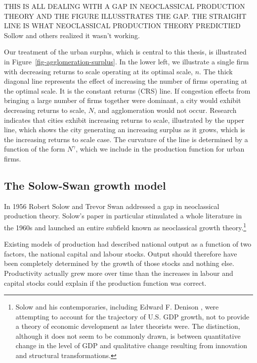 {THIS IS ALL DEALING WITH A GAP IN NEOCLASSICAL PRODUCTION THEORY AND THE FIGURE ILLUSSTRATES THE GAP. THE STRAIGHT LINE IS WHAT NEOCLASSICAL PRODUCTION THEORY PREDICTIED Sollow and others realized it  wasn't working. 

Our treatment of the urban surplus, which is central to this thesis, is illustrated in Figure~\ref{fig-agglomeration-surplus}. 
In the lower left, we illustrate a single firm with decreasing returns to scale operating at its optimal scale, $n$. The thick diagonal line represents the effect of increasing the number of firms operating at the optimal scale. It is the constant returns (CRS) line. If congestion effects from bringing a large number of firms together were dominant, a city would exhibit decreasing returns to  scale,  $N$, and agglomeration would not occur. Research indicates that cities exhibit increasing returns to scale, illustrated by the upper line, which shows the city generating an increasing surplus as it grows, which is the increasing returns to scale case. The curvature of the line is determined by a function of the form $N^\gamma$, which we include in the production function for urban firms. 


\subsection{The Solow-Swan growth model}
In 1956 Robert Solow \cite{solowContributionTheoryEconomic1956} and Trevor Swan \cite{swanEconomicGrowthCapital1956}
addressed a gap in  neoclassical production theory.  Solow's paper in particular stimulated a whole literature in the 1960s and launched an entire subfield known as  neoclassical growth theory.\footnote{Solow and his contemporaries, including Edward F. Denison \cite{denisonSourcesEconomicGrowth1962}, were attempting to account for the trajectory
of U.S. GDP growth, not to provide a theory of economic development as later theorists were. The distinction, although it does not seem to be commonly drawn, is between quantitative change in the level of GDP and qualitative change resulting from innovation and structural transformations.} %


Existing models of production had described national output as a function of two  factors, the national capital and labour stocks. Output should therefore have been completely determined by the growth of those stocks and nothing else. Productivity actually grew more over time than the increases in labour and capital stocks could explain if the production function was correct.

}
